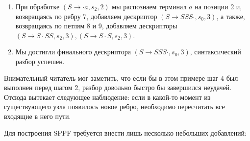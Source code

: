 \begin{example}
\begin{enumerate}
\begin{center}
  	\end{center}
  	
  	\item При обработке $ (S \to \cdot a, s_2, 2) $ мы распознаем терминал $a$ на позиции 2 и, возвращаясь по ребру 7, добавляем дескриптор $ (S \to S S S \cdot, s_0, 3) $, а также, возвращаясь по петлям 8 и 9, добавляем дескрипторы $ (S \to S \cdot S S, s_2, 3), (S \to S \cdot S, s_2, 3) $.
  	
  	\item Мы достигли финального дескриптора $ (S \to S S S \cdot, s_0, 3) $, синтаксический разбор успешен.
  \end{enumerate}

\end{example}

Внимательный читатель мог заметить, что если бы в этом примере шаг 4 был выполнен перед шагом 2, разбор довольно быстро бы завершился неудачей. Отсюда вытекает следующее наблюдение: если в какой-то момент из существующего узла появилось новое ребро, необходимо пересчитать все входящие в него пути. 

Для построения SPPF требуется внести лишь несколько небольших добавлений:


